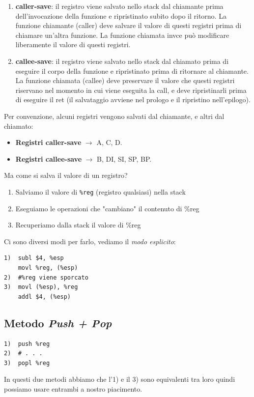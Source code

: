 \begin{enumerate}
    \item \textbf{caller-save}: il registro viene salvato nello stack dal chiamante prima dell’invocazione della funzione e ripristinato subito dopo il ritorno. La funzione chiamante (caller) deve salvare il valore di questi registri prima di chiamare un'altra funzione. La funzione chiamata invce può modificare liberamente il valore di questi registri.
    \item \textbf{callee-save}: il registro viene salvato nello stack dal chiamato prima di eseguire il corpo della funzione e ripristinato prima di ritornare al chiamante. La funzione chiamata (callee) deve preservare il valore che questi registri riservano nel momento in cui viene eseguita la call, e deve ripristinarli prima di eseguire il ret (il salvataggio avviene nel prologo e il ripristino nell’epilogo).
\end{enumerate}
Per convenzione, alcuni registri vengono salvati dal chiamante, e altri dal chiamato:
\begin{itemize}
    \item \textbf{Registri caller-save} $\rightarrow$ A, C, D.
    \item \textbf{Registri callee-save} $\rightarrow$ B, DI, SI, SP, BP.
\end{itemize}
Ma come si salva il valore di un registro?
\begin{enumerate}
    \item Salviamo il valore di \texttt{\%reg} (registro qualsiasi) nella stack
    \item Eseguiamo le operazioni che "cambiano" il contenuto di \%reg
    \item Recuperiamo dalla stack il valore di \%reg
\end{enumerate}
Ci sono diversi modi per farlo, vediamo il \textit{modo esplicito}:
\begin{verbatim}
1)  subl $4, %esp
    movl %reg, (%esp)
2)  #%reg viene sporcato
3)  movl (%esp), %reg
    addl $4, (%esp)
\end{verbatim}
\noindent \subsection{Metodo \textit{Push + Pop}}
\begin{verbatim}
1)  push %reg
2)  # . . .
3)  popl %reg
\end{verbatim}
In questi due metodi abbiamo che l'1) e il 3) sono equivalenti tra loro quindi possiamo usare entrambi a nostro piacimento. \medskip\\
